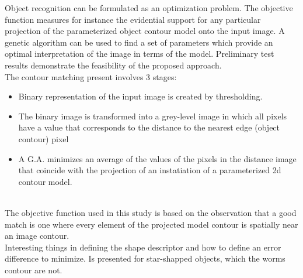 \documentclass{article}
\begin{document}
   Object recognition can be formulated as an optimization problem. The objective function measures for instance the
evidential support for any particular projection of the parameterized object contour model onto the input image. A genetic
algorithm can be used to find a set of parameters which provide an optimal interpretation of the image in terms of the
model. Preliminary test results demonstrate the feasibility of the proposed approach.\\

The contour matching present involves 3 stages:

\begin{itemize}
\item Binary representation of the input image is created
  by thresholding.
\item The binary image is transformed into a grey-level image
  in which all pixels have a value that corresponds to the 
  distance to the nearest edge (object contour) pixel
\item A G.A. minimizes an average of the values of the pixels
  in the distance image that coincide with the projection
  of an instatiation of a parameterized 2d contour model.
\end{itemize}\\

The objective function used in this study
is based on the observation that a good match is one
where every element of the projected model contour
is spatially near an image contour.\\

Interesting things in defining the shape descriptor and 
how to define an error difference to minimize.
Is presented for star-shapped objects, which the worms
contour are not.
\end{document}
